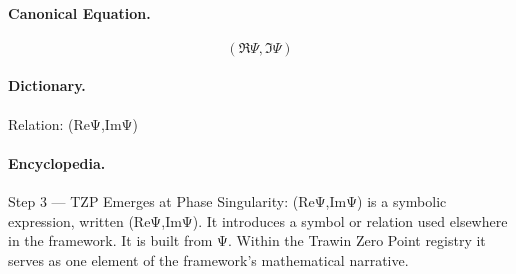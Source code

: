 \paragraph{Canonical Equation.}
\[
(\Re\Psi,\Im\Psi)
\]

\paragraph{Dictionary.}
Relation: (ReΨ,ImΨ)

\paragraph{Encyclopedia.}
Step 3 — TZP Emerges at Phase Singularity: (ReΨ,ImΨ) is a symbolic expression, written (ReΨ,ImΨ). It introduces a symbol or relation used elsewhere in the framework. It is built from Ψ. Within the Trawin Zero Point registry it serves as one element of the framework's mathematical narrative.
